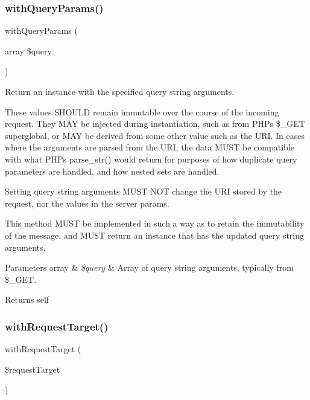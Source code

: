 \subsubsection{\texorpdfstring{with\+Query\+Params()}{withQueryParams()}}
{\footnotesize\ttfamily with\+Query\+Params (\begin{DoxyParamCaption}\item[{array}]{\$query }\end{DoxyParamCaption})}

Return an instance with the specified query string arguments.

These values S\+H\+O\+U\+LD remain immutable over the course of the incoming request. They M\+AY be injected during instantiation, such as from P\+HP\textquotesingle{}s \$\+\_\+\+G\+ET superglobal, or M\+AY be derived from some other value such as the U\+RI. In cases where the arguments are parsed from the U\+RI, the data M\+U\+ST be compatible with what P\+HP\textquotesingle{}s parse\+\_\+str() would return for purposes of how duplicate query parameters are handled, and how nested sets are handled.

Setting query string arguments M\+U\+ST N\+OT change the U\+RI stored by the request, nor the values in the server params.

This method M\+U\+ST be implemented in such a way as to retain the immutability of the message, and M\+U\+ST return an instance that has the updated query string arguments.


\begin{DoxyParams}[1]{Parameters}
array & {\em \$query} & Array of query string arguments, typically from \$\+\_\+\+G\+ET. \\
\hline
\end{DoxyParams}
\begin{DoxyReturn}{Returns}
self 
\end{DoxyReturn}
\mbox{\label{class_pes_1_1_http_1_1_request_ac3ea96f04513448629aa7b03b0fb414a}} 
\subsubsection{\texorpdfstring{with\+Request\+Target()}{withRequestTarget()}}
{\footnotesize\ttfamily with\+Request\+Target (\begin{DoxyParamCaption}\item[{}]{\$request\+Target }\end{DoxyParamCaption})}

